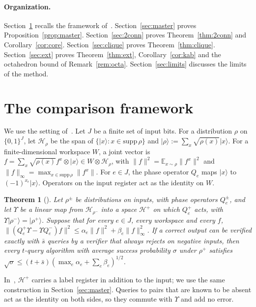 \documentclass[11pt]{article}
\newtheorem{theorem}{Theorem}[section]
\theoremstyle{remark}
\newcommand{\E}{\mathbb{E}}
\newcommand{\norm}[1]{\lVert #1\rVert}
\newcommand{\ket}[1]{\lvert #1\rangle}
\begin{document}
\paragraph{Organization.} Section~\ref{sec:framework} recalls the framework of~\cite{CGZ26}. Section~\ref{sec:master} proves Proposition~\ref{prop:master}. Section~\ref{sec:2conn} proves Theorem~\ref{thm:2conn} and Corollary~\ref{cor:core}. Section~\ref{sec:clique} proves Theorem~\ref{thm:clique}. Section~\ref{sec:ext} proves Theorem~\ref{thm:ext}, Corollary~\ref{cor:kab} and the octahedron bound of Remark~\ref{rem:octa}. Section~\ref{sec:limits} discusses the limits of the method.

\section{The comparison framework}\label{sec:framework}

We use the setting of~\cite[Sections~3 and~4]{CGZ26}. Let $J$ be a finite set of input bits. For a distribution $\rho$ on $\{0,1\}^J$, let $\mathcal H_\rho$ be the span of $\{\ket x:x\in\mathrm{supp}\,\rho\}$ and $\ket\rho:=\sum_x\sqrt{\rho(x)}\ket x$. For a finite-dimensional workspace $W$, a joint vector is $f=\sum_x\sqrt{\rho(x)}f^x\otimes\ket x\in W\otimes\mathcal H_\rho$, with $\norm f^2=\E_{x\sim\rho}\norm{f^x}^2$ and $\norm f_\infty=\max_{x\in\mathrm{supp}\,\rho}\norm{f^x}$. For $e\in J$, the phase operator $Q_e$ maps $\ket x$ to $(-1)^{x_e}\ket x$. Operators on the input register act as the identity on $W$.

\begin{theorem}[{\cite[Theorem~4.1]{CGZ26}}]\label{thm:compare}
Let $\rho^\pm$ be distributions on inputs, with phase operators $Q_e^\pm$, and let $\Upsilon$ be a linear map from $\mathcal H_{\rho^-}$ into a space $\mathcal H^+$ on which $Q_e^+$ acts, with $\Upsilon\ket{\rho^-}=\ket{\rho^+}$. Suppose that for every $e\in J$, every workspace and every $f$, $\norm{(Q_e^+\Upsilon-\Upsilon Q_e^-)f}^2\le\alpha_e\norm f^2+\beta_e\norm f_\infty^2$. If a correct output can be verified exactly with $\bar s$ queries by a verifier that always rejects on negative inputs, then every $t$-query algorithm with average success probability $\sigma$ under $\rho^+$ satisfies $\sqrt\sigma\le(t+\bar s)(\max_e\alpha_e+\sum_e\beta_e)^{1/2}$.
\end{theorem}

In~\cite{CGZ26}, $\mathcal H^+$ carries a label register in addition to the input; we use the same construction in Section~\ref{sec:master}. Queries to pairs that are known to be absent act as the identity on both sides, so they commute with $\Upsilon$ and add no error.
\end{document}
